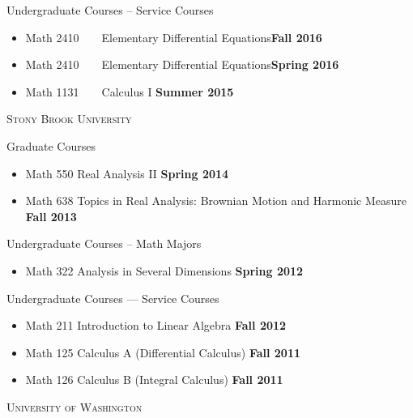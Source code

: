 \documentclass[12pt]{amsart}
\begin{document}
\textsf{Undergraduate Courses -- Service Courses}
\begin{itemize}
\item Math 2410\ \ \ \ Elementary Differential Equations\hfill\textbf{Fall 2016}
\item Math 2410\ \ \ \ Elementary Differential Equations\hfill\textbf{Spring 2016}
\item Math 1131\ \ \ \, Calculus I \hfill \textbf{Summer 2015}
\end{itemize} \vspace{.2cm}

\noindent \textsc{Stony Brook University}\vspace{.1cm}

\textsf{Graduate Courses} \begin{itemize}
\item Math 550 Real Analysis II \hfill \textbf{Spring 2014}
\item Math 638 Topics in Real Analysis: {\small Brownian Motion and Harmonic Measure} \hfill \textbf{Fall 2013}
\end{itemize}

\vspace{.1cm}

\textsf{Undergraduate Courses -- Math Majors}\begin{itemize}
\item Math 322 Analysis in Several Dimensions \hfill \textbf{Spring 2012}
\end{itemize}

\vspace{.1cm}

\textsf{Undergraduate Courses --- Service Courses}\begin{itemize}
\item Math 211 Introduction to Linear Algebra \hfill \textbf{Fall 2012}
\item Math 125 Calculus A (Differential Calculus) \hfill \textbf{Fall 2011}
\item Math 126 Calculus B (Integral Calculus) \hfill \textbf{Fall 2011}
\end{itemize}
\vspace{.2cm}


\newpage\noindent \textsc{University of Washington}\vspace{.1cm}
\end{document}
